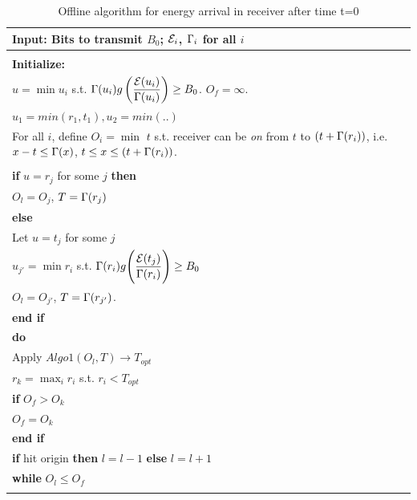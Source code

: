 \begin{table}
\begin{minipage}[b]{8cm}
\caption {Offline algorithm for energy arrival in receiver after time t=0}
\begin{tabular}{p{7cm}}
\hline \textbf{Input}: Bits to transmit $B_0$; $\mathcal{E}_i$, $\Gamma_i$ for all $i$
\\
\hline
\\
\textbf{Initialize:}
\\ 
$u=\min u_i$ s.t. $\Gamma(u_i)g\left( \dfrac{\mathcal{E}(u_i)}{\Gamma(u_i)} \right) \ge B_0$. $O_f=\infty$.\\ $u_1=min(r_1,t_1),u_2=min(..)$
\\
For all $i$, define $O_i=\min$ $t$ s.t. receiver can be \textit{on} from $t$ to $(t+\Gamma(r_i))$, i.e. $x-t \le \Gamma(x)$,  $t \le x\le (t+\Gamma(r_i))$.
\\
\\
\textbf{if} $u=r_j$ for some $j$  \textbf{then}
\\
\hspace{4mm}$O_l=O_{j}$, $T=\Gamma(r_j)$
\\
\textbf{else}
\\
\hspace{4mm}Let $u=t_j$ for some $j$
\\
\hspace{4mm}$u_{j'}=\min r_i$ s.t. $\Gamma(r_i)g\Bigg{(} \dfrac{\mathcal{E}(t_j)}{\Gamma(r_i)}\Bigg{)}\ge B_0$
\\
\hspace{4mm}$O_l=O_{j'}$, $T=\Gamma(r_{j'})$.
\\
\textbf{end if}
\\
\textbf{do}
\\
\hspace{4mm}Apply $Algo1(O_l,T)\rightarrow T_{opt}$
\\
\hspace{4mm}$r_k=\max_i r_i $ s.t. $r_i<T_{opt}$ 
\\
\hspace{4mm}\textbf{if} $O_{f} > O_{k}$
\\
\hspace{7mm}$O_{f} = O_{k}$
\\
\hspace{4mm}\textbf{end if}
\\
\hspace{4mm}\textbf{if} hit origin \textbf{then} $l=l-1$ \textbf{else} $l=l+1$
\\
\textbf{while} $O_l \le O_{f}$
\\
\hline
\label{online}
\end{tabular}
\end{minipage}
\end{table}
